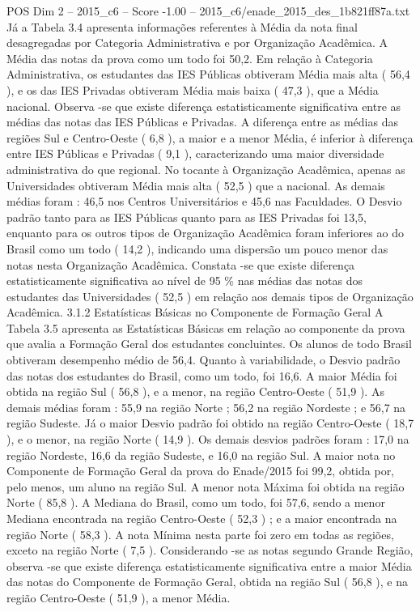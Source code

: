 \begin{textsample}{POS Dim 2 – 2015\_c6 – Score -1.00 – 2015\_c6/enade\_2015\_des\_1b821ff87a.txt}
Já a Tabela 3.4 apresenta informações referentes à Média da nota final desagregadas por Categoria Administrativa e por Organização Acadêmica.
A Média das notas da prova como um todo foi 50,2.
Em relação à Categoria Administrativa, os estudantes das IES Públicas obtiveram Média mais alta ( 56,4 ), e os das IES Privadas obtiveram Média mais baixa ( 47,3 ), que a Média nacional.
Observa -se que existe diferença estatisticamente significativa entre as médias das notas das IES Públicas e Privadas.
A diferença entre as médias das regiões Sul e Centro-Oeste ( 6,8 ), a maior e a menor Média, é inferior à diferença entre IES Públicas e Privadas ( 9,1 ), caracterizando uma maior diversidade administrativa do que regional.
No tocante à Organização Acadêmica, apenas as Universidades obtiveram Média mais alta ( 52,5 ) que a nacional.
As demais médias foram : 46,5 nos Centros Universitários e 45,6 nas Faculdades.
O Desvio padrão tanto para as IES Públicas quanto para as IES Privadas foi 13,5, enquanto para os outros tipos de Organização Acadêmica foram inferiores ao do Brasil como um todo ( 14,2 ), indicando uma dispersão um pouco menor das notas nesta Organização Acadêmica.
Constata -se que existe diferença estatisticamente significativa ao nível de 95 \% nas médias das notas dos estudantes das Universidades ( 52,5 ) em relação aos demais tipos de Organização Acadêmica. 3.1.2 Estatísticas Básicas no Componente de Formação Geral A Tabela 3.5 apresenta as Estatísticas Básicas em relação ao componente da prova que avalia a Formação Geral dos estudantes concluintes.
Os alunos de todo Brasil obtiveram desempenho médio de 56,4.
Quanto à variabilidade, o Desvio padrão das notas dos estudantes do Brasil, como um todo, foi 16,6.
A maior Média foi obtida na região Sul ( 56,8 ), e a menor, na região Centro-Oeste ( 51,9 ).
As demais médias foram : 55,9 na região Norte ; 56,2 na região Nordeste ; e 56,7 na região Sudeste.
Já o maior Desvio padrão foi obtido na região Centro-Oeste ( 18,7 ), e o menor, na região Norte ( 14,9 ).
Os demais desvios padrões foram : 17,0 na região Nordeste, 16,6 da região Sudeste, e 16,0 na região Sul.
A maior nota no Componente de Formação Geral da prova do Enade/2015 foi 99,2, obtida por, pelo menos, um aluno na região Sul.
A menor nota Máxima foi obtida na região Norte ( 85,8 ).
A Mediana do Brasil, como um todo, foi 57,6, sendo a menor Mediana encontrada na região Centro-Oeste ( 52,3 ) ; e a maior encontrada na região Norte ( 58,3 ).
A nota Mínima nesta parte foi zero em todas as regiões, exceto na região Norte ( 7,5 ).
Considerando -se as notas segundo Grande Região, observa -se que existe diferença estatisticamente significativa entre a maior Média das notas do Componente de Formação Geral, obtida na região Sul ( 56,8 ), e na região Centro-Oeste ( 51,9 ), a menor Média.

\end{textsample}
